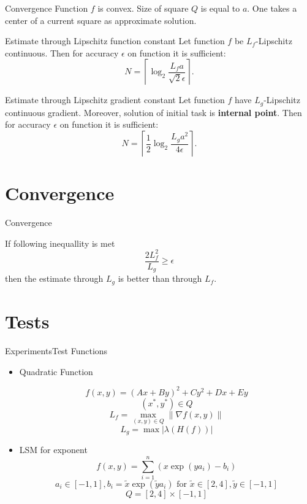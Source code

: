 \documentclass{beamer}
\begin{document}
\begin{frame}{Convergence}
Function $f$ is convex. Size of square $Q$ is equal to $a$. One takes a center of a current square as approximate  solution.
\begin{block}{Estimate through Lipschitz function constant}
Let function $f$ be $L_f$-Lipschitz continuous. Then for accuracy $\epsilon$ on function it is sufficient:
\begin{equation}\label{NI1}N = \left\lceil\log_2\frac{L_fa}{\sqrt{2}\epsilon}\right\rceil.\end{equation}
\end{block}

\begin{block}{Estimate through Lipschitz gradient constant}
Let function $f$ have $L_g$-Lipschitz continuous gradient. Moreover, solution of initial task is \textbf{internal point}. Then for accuracy $\epsilon$ on function it is sufficient:
\begin{equation}\label{NI3}N = \left\lceil\frac{1}{2}\log_2\frac{L_ga^2}{4\epsilon}\right\rceil.\end{equation}
\end{block}
\end{frame}

\section{Convergence}

\begin{frame}{Convergence}

If following inequallity is met
$$\frac{2L_f^2}{L_g} \geq \epsilon$$
then the estimate through $L_g$ is better than through $L_f$.
\end{frame}

\section{Tests}

\begin{frame}{Experiments}{Test Functions}

\begin{itemize}
\item{Quadratic Function

$$f(x,y) = (Ax+By)^2+Cy^2 + Dx+Ey$$
$$(x^*, y^*)\in Q$$
$$L_f = \max\limits_{(x,y) \in Q}\|\nabla f(x, y)\|$$
$$L_g = \max |\lambda\left(H(f)\right)|$$\pause
}

\item{LSM for exponent
$$f(x,y) = \sum\limits_{i=1}^n \left(x\exp(ya_i) - b_i\right)$$
$$a_i \in [-1, 1], b_i = \tilde{x}\exp(\tilde{y}a_i) \text{ for } \tilde{x} \in [2, 4], \tilde{y}\in[-1, 1]$$
$$Q = [2, 4]\times [-1, 1]$$
}
\end{itemize}
\end{frame}
\end{document}
